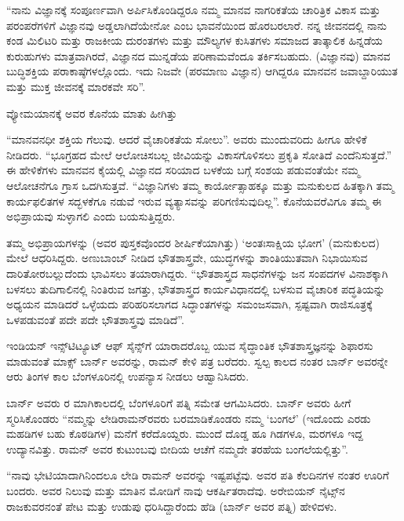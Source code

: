 \enginline{-}“ನಾನು ವಿಜ್ಞಾನಕ್ಕೆ ಸಂಪೂರ್ಣವಾಗಿ ಅರ್ಪಿಸಿಕೊಂಡಿದ್ದರೂ ನಮ್ಮ ಮಾನವ ನಾಗರಿಕತೆಯ ಚಾರಿತ್ರಿಕ ವಿಕಾಸ ಮತ್ತು ಪರಂಪರೆಗಳಿಗೆ ವಿಜ್ಞಾನವು ಅಡ್ಡಲಾಗಿದೆಯೇನೋ ಎಂಬ ಭಾವನೆಯಿಂದ ಹೊರಬರಲಾರೆ. ನನ್ನ ಜೀವನದಲ್ಲಿ ನಾನು ಕಂಡ ಮಿಲಿಟರಿ ಮತ್ತು ರಾಜಕೀಯ ದುರಂತಗಳು ಮತ್ತು ಮೌಲ್ಯಗಳ ಕುಸಿತಗಳು ಸಮಾಜದ ತಾತ್ಕಾಲಿಕ ಹಿನ್ನಡೆಯ ಕುರುಹುಗಳು ಮಾತ್ರವಾಗಿರದೆ, ವಿಜ್ಞಾನದ ಮುನ್ನಡೆಯ ಪರಿಣಾಮವೆಂದೂ ತರ್ಕಿಸಬಹುದು. (ವಿಜ್ಞಾನವು) ಮಾನವ ಬುದ್ಧಿಶಕ್ತಿಯ ಪರಾಕಾಷ್ಠೆಗಳಲ್ಲೊಂದು. ಇದು ನಿಜವೇ (ಪರಮಾಣು ವಿಜ್ಞಾನ) ಆಗಿದ್ದರೂ ಮಾನವನ ಜವಾಬ್ದಾರಿಯುತ ಮತ್ತು ಮುಕ್ತ ಜೀವನಕ್ಕೆ ಮಾರಕವೇ ಸರಿ”.

ವ್ಯೋಮಯಾನಕ್ಕೆ ಅವರ ಕೊನೆಯ ಮಾತು ಹೀಗಿತ್ತು\enginline{-}

“ಮಾನವನಧೀ ಶಕ್ತಿಯ ಗೆಲುವು. ಆದರೆ ವೈಚಾರಿಕತೆಯ ಸೋಲು”. ಅವರು ಮುಂದುವರಿದು ಹೀಗೂ ಹೇಳಿಕೆ ನೀಡಿದರು.\enginline{-} “ಭೂಗ್ರಹದ ಮೇಲೆ ಆಲೋಚಿಸಬಲ್ಲ ಜೀವಿಯನ್ನು ವಿಕಾಸಗೊಳಿಸಲು ಪ್ರಕೃತಿ ಸೋತಿದೆ ಎಂದೆನಿಸುತ್ತದೆ.” ಈ ಹೇಳಿಕೆಗಳು ಮಾನವನ ಕೈಯಲ್ಲಿ ವಿಜ್ಞಾನದ ಸರಿಯಾದ ಬಳಕೆಯ ಬಗ್ಗೆ ಸಂಶಯ ಪಡುವಂತೆಯೇ ನಮ್ಮ ಆಲೋಚನೆಗೂ ಗ್ರಾಸ ಒದಗಿಸುತ್ತವೆ. “ವಿಜ್ಞಾನಿಗಳು ತಮ್ಮ ಕಾರ್ಯೋತ್ಸಾಹಕ್ಕೂ ಮತ್ತು ಮನುಕುಲದ ಹಿತಕ್ಕಾಗಿ ತಮ್ಮ ಕಾರ್ಯಫಲಿತಗಳ ಸದ್ಭಳಕೆಗೂ ನಡುವೆ ಇರುವ ವ್ಯತ್ಯಾಸವನ್ನು ಪರಿಗಣಿಸುವುದಿಲ್ಲ”. ಕೊನೆಯವರೆವಿಗೂ ತಮ್ಮ ಈ ಅಭಿಪ್ರಾಯವು ಸುಳ್ಳಾಗಲಿ ಎಂದು ಬಯಸುತ್ತಿದ್ದರು.

ತಮ್ಮ ಅಭಿಪ್ರಾಯಗಳನ್ನು \textit{} (ಅವರ ಪುಸ್ತಕವೊಂದರ ಶೀರ್ಷಿಕೆಯಾಗಿತ್ತು)\enginline{-} ‘ಅಂತಃಸಾಕ್ಷಿಯ ಭೋಗ’ (ಮನುಕುಲದ) ಮೇಲೆ ಆಧರಿಸಿದ್ದರು. ಅಣುಬಾಂಬ್ ನೀಡಿದ ಭೌತಶಾಸ್ತ್ರವೇ, ಯುದ್ಧಗಳನ್ನು ಶಾಂತಿಯುತವಾಗಿ ನಿಭಾಯಿಸುವ ದಾರಿತೋರಬಲ್ಲುದೆಂದು ಭಾವಿಸಲು ತಯಾರಾಗಿದ್ದರು. “ಭೌತಶಾಸ್ತ್ರದ ಸಾಧನೆಗಳನ್ನು ಜನ ಸಂಪದಗಳ ವಿನಾಶಕ್ಕಾಗಿ ಬಳಸಲು ತುದಿಗಾಲಿನಲ್ಲಿ ನಿಂತಿರುವ ಜಗತ್ತು, ಭೌತಶಾಸ್ತ್ರದ ಕಾರ್ಯವಿಧಾನದಲ್ಲಿ ಬಳಸುವ ವೈಚಾರಿಕ ಪದ್ಧತಿಯನ್ನು ಅಧ್ಯಯನ ಮಾಡಿದರೆ ಒಳ್ಳೆಯದು ಪರಿಹರಿಸಲಾಗದ ಸಿದ್ಧಾಂತಗಳನ್ನು ಸಮಂಜಸವಾಗಿ, ಸ್ಪಷ್ಟವಾಗಿ ರಾಜಿಸೂತ್ರಕ್ಕೆ ಒಳಪಡುವಂತೆ ಪದೇ ಪದೇ ಭೌತಶಾಸ್ತ್ರವು ಮಾಡಿದೆ”.

ಇಂಡಿಯನ್ ಇನ್ಸ್‌ಟಿಟ್ಯೂಟ್ ಆಫ್ ಸೈನ್ಸ್‌ಗೆ ಯಾರಾದರೊಬ್ಬ ಯುವ ಸೈದ್ಧಾಂತಿಕ ಭೌತಶಾಸ್ತ್ರಜ್ಞನನ್ನು ಶಿಫಾರಸು ಮಾಡುವಂತೆ ಮಾಕ್ಸ್ ಬಾರ್ನ್ ಅವರನ್ನು, ರಾಮನ್ ಕೇಳಿ ಪತ್ರ ಬರೆದರು. ಸ್ವಲ್ಪ ಕಾಲದ ನಂತರ ಬಾರ್ನ್ ಅವರನ್ನೇ ಆರು ತಿಂಗಳ ಕಾಲ ಬೆಂಗಳೂರಿನಲ್ಲಿ ಉಪನ್ಯಾಸ ನೀಡಲು ಆಹ್ವಾನಿಸಿದರು.

ಬಾರ್ನ್ ಅವರು ರ ಮಾಗಿಕಾಲದಲ್ಲಿ ಬೆಂಗಳೂರಿಗೆ ಪತ್ನಿ ಸಮೇತ ಆಗಮಿಸಿದರು. ಬಾರ್ನ್ ಅವರು ಹೀಗೆ ಸ್ಮರಿಸಿಕೊಂಡರು\enginline{-} “ನಮ್ಮನ್ನು ಲೇಡಿರಾಮನ್‍ರವರು ಬರಮಾಡಿಕೊಂಡರು ನಮ್ಮ ‘ಬಂಗಲೆ’ \enginline{-}(ಇದೊಂದು ಎರಡು ಮಹಡಿಗಳ ಬಹು ಕೊಠಡಿಗಳ) ಮನೆಗೆ ಕರೆದೊಯ್ದರು. ಮುಂದೆ ದೊಡ್ಡ ಹೂ ಗಿಡಗಳೂ, ಮರಗಳೂ ಇದ್ದ ಉದ್ಯಾನವಿತ್ತು. ರಾಮನ್ ಅವರ ಕುಟುಂಬವು ಬೀದಿಯ ಆಚೆಗೆ ನಮ್ಮದೇ ತರಹೆಯ ಬಂಗಲೆಯಲ್ಲಿತ್ತು”.

“ನಾವು ಭೇಟಿಯಾದಾಗಿನಿಂದಲೂ ಲೇಡಿ ರಾಮನ್ ಅವರನ್ನು ಇಷ್ಟಪಟ್ಟೆವು. ಅವರ ಪತಿ ಕೆಲದಿನಗಳ ನಂತರ ಊರಿಗೆ ಬಂದರು. ಅವರ ನಿಲುವು ಮತ್ತು ಮಾತಿನ ಮೋಡಿಗೆ ನಾವು ಆಕರ್ಷಿತರಾದೆವು. ಅರೇಬಿಯನ್ ನೈಟ್ಸ್‌ನ ರಾಜಕುವರನಂತೆ ಪೇಟ ಮತ್ತು ಉಡುಪು ಧರಿಸಿದ್ದಾರೆಂದು ಹೆಡಿ (ಬಾರ್ನ್ ಅವರ ಪತ್ನಿ) ಹೇಳಿದಳು.

